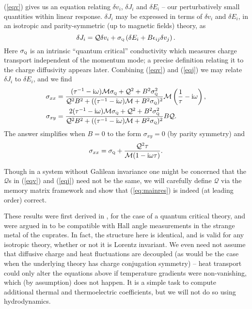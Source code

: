 \documentclass[10pt, oneside]{book}
\begin{document}
\begin{doublespace}
(\ref{eqv}) gives us an equation relating $\delta v_i$, $\delta J_i$ and $\delta E_i$ -- our perturbatively small quantities within linear response.    $\delta J_i$ may be expressed in terms of $\delta v_i$ and $\delta E_i$, in an isotropic and parity-symmetric (up to magnetic fields) theory, as \begin{equation}
\delta J_i = \mathcal{Q}\delta v_i + \sigma_{\textsc{q}} \left(\delta E_i + B \epsilon_{ij} \delta v_j\right).   \label{eqj}
\end{equation}  
Here $\sigma_{\textsc{q}}$ is an intrinsic ``quantum critical'' conductivity which measures charge transport independent of the momentum mode; a precise definition relating it to the charge diffusivity appears later.   
Combining (\ref{eqv}) and (\ref{eqj}) we may relate $\delta J_i$ to $\delta E_i$, and we find 
\begin{subequations}\begin{align}
\sigma_{xx} &= \frac{(\tau^{-1}-\mathrm{i}\omega)\mathcal{M}\sigma_{\textsc{q}} + \mathcal{Q}^2 + B^2\sigma_{\textsc{q}}^2}{\mathcal{Q}^2B^2 + ((\tau^{-1}-\mathrm{i}\omega)\mathcal{M}+B^2\sigma_{\textsc{q}})^2} \mathcal{M}\left(\frac{1}{\tau}-\mathrm{i}\omega\right), \\
\sigma_{xy} &=  \frac{2(\tau^{-1}-\mathrm{i}\omega)\mathcal{M}\sigma_{\textsc{q}} + \mathcal{Q}^2 + B^2\sigma_{\textsc{q}}^2}{\mathcal{Q}^2B^2 + ((\tau^{-1}-\mathrm{i}\omega)\mathcal{M}+B^2\sigma_{\textsc{q}})^2} B\mathcal{Q}.
\end{align}
\label{eq:mainres}
\end{subequations}
The answer simplifies when $B=0$ to the form $\sigma_{xy}=0$ (by parity symmetry) and \begin{equation}
\sigma_{xx} = \sigma_{\textsc{q}} + \frac{\mathcal{Q}^2\tau}{\mathcal{M}(1-\mathrm{i}\omega \tau)}.  \label{eqb0}
\end{equation}

Though in a system without Galilean invariance one might be concerned that the $\mathcal{Q}$s in (\ref{eqv}) and (\ref{eqj}) need not be the same, we will carefully define $\mathcal{Q}$ via the memory matrix framework and show that (\ref{eq:mainres}) is indeed (at leading order) correct.

These results were first derived in \cite{hkms}, for the case of a quantum critical theory, and were argued in \cite{Blake:2014yla} to be compatible
with Hall angle measurements in the strange metal of the cuprates.   In fact, the structure here is identical, and is valid for any isotropic theory, whether or not it is Lorentz invariant.    We even need not assume that diffusive charge and heat fluctuations are decoupled (as would be the case when the underlying theory has charge conjugation symmetry) -- heat transport could only alter the equations above if temperature gradients were non-vanishing, which (by assumption) does not happen.   It is a simple task to compute additional thermal and thermoelectric coefficients, but we will not do so using hydrodynamics. 


\end{doublespace}
\end{document}
